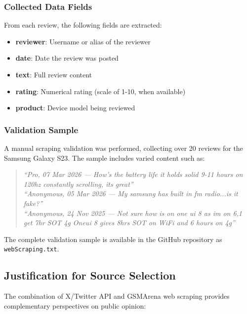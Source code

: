 \documentclass[12pt]{article}
\begin{document}
\subsubsection{Collected Data Fields}
From each review, the following fields are extracted:
\begin{itemize}
    \item \textbf{reviewer}: Username or alias of the reviewer
    \item \textbf{date}: Date the review was posted
    \item \textbf{text}: Full review content
    \item \textbf{rating}: Numerical rating (scale of 1-10, when available)
    \item \textbf{product}: Device model being reviewed
\end{itemize}

\subsubsection{Validation Sample}
A manual scraping validation was performed, collecting over 20 reviews for the Samsung Galaxy S23. The sample includes varied content such as:

\begin{quote}
\textit{“Pro, 07 Mar 2026 — How's the battery life it holds solid 9-11 hours on 120hz constantly scrolling, its great”} \\
\textit{“Anonymous, 05 Mar 2026 — My samsung has built in fm radio...is it fake?”} \\
\textit{“Anonymous, 24 Nov 2025 — Not sure how is on one ui 8 as im on 6,1 get 7hr SOT 4g Oneui 8 gives 8hrs SOT on WiFi and 6 hours on 4g”}
\end{quote}

The complete validation sample is available in the GitHub repository as \texttt{webScraping.txt}.

\subsection{Justification for Source Selection}

The combination of X/Twitter API and GSMArena web scraping provides complementary perspectives on public opinion:
\end{document}
